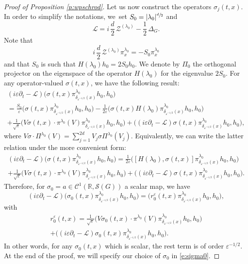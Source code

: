 \documentclass[JEP,XML,SOM,Unicode,published]{cedram}
\let\mathcal\mathscr
\theoremstyle{plain}
\theoremstyle{definition}
\let\eps\varepsilon
\def\R{{\mathbb R}}
\begin{document}
\begin{proof}[Proof of Proposition \ref{p:wpschrod}]
Let us now construct the operators $\sigma_j(t,x)$.
In order to simplify the notations, we~set $S_0=
|\lambda_0|^{\sfrac{d}{ 2}}$ and
\[
\mathcal L = i \,\frac{d}{2}\, \mathcal Z ^{(\lambda_0)} -\frac 12\, \Delta_G.
\]
Note that
\[
i\,\frac{d}{2}\, \mathcal Z ^{(\lambda_0)}\pi^{\lambda_0}_x= -S_0 \pi^{\lambda_0}_x
\]
and that $S_0$ is such that $H(\lambda_0) h_0= 2S_0 h_0$. We denote by $\Pi_0$ the orthogonal projector on the eigenspace of the operator $H(\lambda_0)$ for the eigenvalue $2S_0$.
For any operator-valued $\sigma(t,x)$, we have the following result:
\begin{multline*}
(i\eps\partial_t-\mathcal{L})\bigl(\sigma(t,x)\pi^{\lambda_0}_{\delta_{\eps^{-1/2}}(x)}h_0,h_0\bigr)\\
=\frac{S_0}{\eps}\bigl(\sigma (t,x)\pi^{\lambda_0}_{\delta_{\eps^{-1/2}}(x)}h_0,h_0\bigr)-\frac{1}{2\eps}\bigl(\sigma (t,x)H(\lambda_0)\pi^{\lambda_0}_{\delta_{\eps^{-1/2}}(x)}h_0,h_0\bigr)\\
+\frac{1}{\sqrt\eps}\bigl(V\sigma(t,x)\cdot \pi^{\lambda_0}(V)\pi^{\lambda_0}_{\delta_{\eps^{-1/2}}(x)}h_0,h_0\bigr)+\bigl((i\eps\partial_t-\mathcal{L})\sigma (t,x)\pi^{\lambda_0}_{\delta_{\eps^{-1/2}}(x)}h_0,h_0\bigr),
\end{multline*}
where $V\sigma\cdot \Pi^{\lambda_0}(V)= \sum_{j=1}^{2d} V_j\sigma \Pi^{\lambda_0}(V_j)$.
Equivalently, we can write the latter relation under the more convenient form:
\begin{multline}
\label{computationcle}
(i\eps\partial_t-\mathcal{L})\bigl(\sigma (t,x)\pi^{\lambda_0}_{\delta_{\eps^{-1/2}}(x)}h_0,h_0\bigr)=\frac{1}{2\eps}\bigl([H(\lambda_0),\sigma (t,x)]\pi^{\lambda_0}_{\delta_{\eps^{-1/2}}(x)}h_0,h_0\bigr)\\
+\frac{1}{\sqrt\eps}\bigl(V\sigma(t,x)\cdot \pi^{\lambda_0}(V)\pi^{\lambda_0}_{\delta_{\eps^{-1/2}}(x)}h_0,h_0\bigr)+\bigl((i\eps\partial_t-\mathcal{L})\sigma(t,x)\pi^{\lambda_0}_{\delta_{\eps^{-1/2}}(x)}h_0,h_0\bigr).
\end{multline}
Therefore, for $\sigma_0=a\in\mathcal{C}^1(\R,\mathcal{S}(G))$ a scalar map, we have
\begin{equation*}
(i\eps \partial_t - \mathcal{L})\bigl(\sigma_0(t,x)\pi^{\lambda_0}_{\delta_{\eps^{-1/2}}(x)}h_0,h_0\bigr)=
\bigl(r_0^\eps(t,x)\pi^{\lambda_0}_{\delta_{\eps^{-1/2}}(x)}h_0,h_0\bigr),
\end{equation*}
with
\begin{multline*}%
r_0^\eps(t,x)= \frac{1}{\sqrt\eps} \bigl(V\sigma_0(t,x)\cdot \pi^{\lambda_0}(V)\pi^{\lambda_0}_{\delta_{\eps^{-1/2}}(x)}h_0,h_0\bigr)\\
+\bigl((i\eps\partial_t -\mathcal{L})\sigma_0(t,x)\pi^{\lambda_0}_{\delta_{\eps^{-1/2}}(x)}h_0,h_0\bigr).
\end{multline*}
In other words, for any $\sigma_0(t,x)$ which is scalar, the rest term is of order $\eps^{-1/2}$. At the end of the proof, we will specify our choice of $\sigma_0$ in \eqref{e:sigma0}.


\end{proof}
\end{document}
